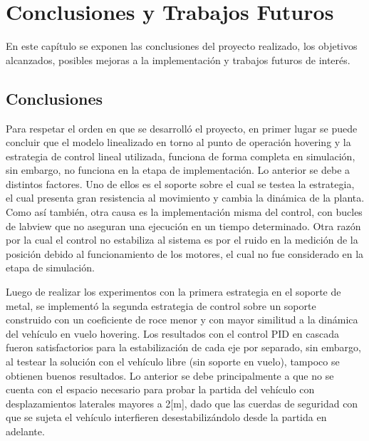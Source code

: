 \documentclass[../main.tex]{subfiles}
\begin{document}
\chapter{Conclusiones y Trabajos Futuros}

En este capítulo se exponen las conclusiones del proyecto realizado, los objetivos alcanzados, posibles mejoras a la implementación y trabajos futuros de interés.

\section{Conclusiones}

Para respetar el orden en que se desarrolló el proyecto, en primer lugar se puede concluir que el modelo linealizado en torno al punto de operación hovering y la estrategia de control lineal utilizada, funciona de forma completa en simulación, sin embargo, no funciona en la etapa de implementación. Lo anterior se debe a distintos factores. Uno de ellos es el soporte sobre el cual se testea la estrategia, el cual presenta gran resistencia al movimiento y cambia la dinámica de la planta. Como así también, otra causa es la implementación misma del control, con bucles de labview que no aseguran una ejecución en un tiempo determinado. Otra razón por la cual el control no estabiliza al sistema es por el ruido en la medición de la posición debido al funcionamiento de los motores, el cual no fue considerado en la etapa de simulación.

\hfill \break

Luego de realizar los experimentos con la primera estrategia en el soporte de metal, se implementó la segunda estrategia de control sobre un soporte construido con un coeficiente de roce menor y con mayor similitud a la dinámica del vehículo en vuelo hovering. Los resultados con el control PID en cascada fueron satisfactorios para la estabilización de cada eje por separado, sin embargo, al testear la solución con el vehículo libre (sin soporte en vuelo), tampoco se obtienen buenos resultados. Lo anterior se debe principalmente a que no se cuenta con el espacio necesario para probar la partida del vehículo con desplazamientos laterales mayores a 2[m], dado que las cuerdas de seguridad con que se sujeta el vehículo interfieren desestabilizándolo desde la partida en adelante.

\hfill \break
\end{document}

